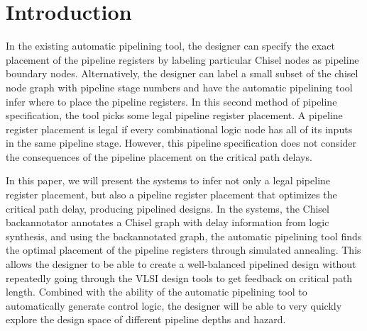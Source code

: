 \section{Introduction}
In the existing automatic pipelining tool, the designer can specify the exact placement of the pipeline registers by labeling particular Chisel nodes as pipeline boundary nodes. Alternatively, the designer can label a small subset of the chisel node graph with pipeline stage numbers and have the automatic pipelining tool infer where to place the pipeline registers. In this second method of pipeline specification, the tool picks some legal pipeline register placement. A pipeline register placement is legal if every combinational logic node has all of its inputs in the same pipeline stage. However, this pipeline specification does not consider the consequences of the pipeline placement on the critical path delays.

In this paper, we will present the systems to infer not only a legal pipeline register placement, but also a pipeline register placement that optimizes the critical path delay, producing pipelined designs. In the systems, the Chisel backannotator annotates a Chisel graph with delay information from logic synthesis, and using the backannotated graph, the automatic pipelining tool finds the optimal placement of the pipeline registers through simulated annealing. This allows the designer to be able to create a well-balanced pipelined design without repeatedly going through the VLSI design tools to get feedback on critical path length. Combined with the ability of the automatic pipelining tool to automatically generate control logic, the designer will be able to very quickly explore the design space of different pipeline depths and hazard. 
